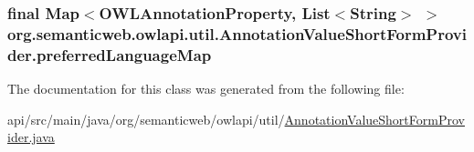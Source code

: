 \hypertarget{classorg_1_1semanticweb_1_1owlapi_1_1util_1_1_annotation_value_short_form_provider_a83a9a4c80131f3f5044efb8ba4073e41}{
\subsubsection[{preferred\-Language\-Map}]{\setlength{\rightskip}{0pt plus 5cm}final Map$<${\bf O\-W\-L\-Annotation\-Property}, List$<$String$>$ $>$ org.\-semanticweb.\-owlapi.\-util.\-Annotation\-Value\-Short\-Form\-Provider.\-preferred\-Language\-Map\hspace{0.3cm}{\ttfamily [private]}}}\label{classorg_1_1semanticweb_1_1owlapi_1_1util_1_1_annotation_value_short_form_provider_a83a9a4c80131f3f5044efb8ba4073e41}


The documentation for this class was generated from the following file\-:\begin{DoxyCompactItemize}
\item 
api/src/main/java/org/semanticweb/owlapi/util/\hyperlink{_annotation_value_short_form_provider_8java}{Annotation\-Value\-Short\-Form\-Provider.\-java}\end{DoxyCompactItemize}
